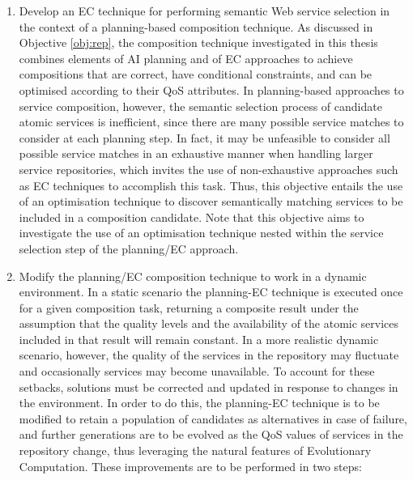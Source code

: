 \begin{enumerate}
 \item \label{obj:semantic} Develop an EC technique for performing semantic Web service selection in the context of a planning-based composition technique. As discussed in Objective \ref{obj:rep}, the composition technique investigated in this thesis combines elements of AI planning and of EC approaches to achieve compositions that are correct, have conditional constraints, and can be optimised according to their QoS attributes. In planning-based approaches to service composition, however, the semantic selection process of candidate atomic services is inefficient, since there are many possible service matches to consider at each planning step. In fact, it may be unfeasible to consider all possible service matches in an exhaustive manner when handling larger service repositories, which invites the use of non-exhaustive approaches such as EC techniques to accomplish this task. Thus, this objective entails the use of an optimisation technique to discover semantically matching services to be included in a composition candidate. Note that this objective aims to investigate the use of an optimisation technique nested within the service selection step of the planning/EC approach.
 
 \item \label{obj:dyna} Modify the planning/EC composition technique to work in a dynamic environment. In a static scenario the planning-EC technique is executed once for a given composition task, returning a composite result under the assumption that the quality levels and the availability of the atomic services included in that result will remain constant. In a more realistic dynamic scenario, however, the quality of the services in the repository may fluctuate and occasionally services may become unavailable. To account for these setbacks, solutions must be corrected and updated in response to changes in the environment. In order to do this, the planning-EC technique is to be modified to retain a population of candidates as alternatives in case of failure, and further generations are to be evolved as the QoS values of services in the repository change, thus leveraging the natural features of Evolutionary Computation. These improvements are to be performed in two steps:
 

\end{enumerate}
